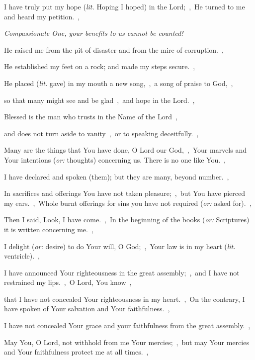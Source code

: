 \documentclass[12pt,twoside,a5paper]{article}
\newcommand{\qanona}[1]{{\liturgicalhint{Qanona.} \emph{#1}}}
\newcommand{\translationoption}[1]{\emph{or:} #1}
\newcommand{\translationliteral}[1]{\emph{lit.} #1}
\begin{document}
\begin{normalparskip}
  I have truly put my hope (\translationliteral{Hoping I hoped}) in the Lord;~\sep\ He turned to me and heard my petition.~\sep

  \qanona{Compassionate One, your benefits to us cannot be counted!}

  He raised me from the pit of disaster and from the mire of corruption.~\sep

  He established my feet on a rock; and made my steps secure.~\sep

  He placed (\translationliteral{gave}) in my mouth a new song,~\sep\ a song of praise to God,~\sep

  so that many might see and be glad~\sep\ and hope in the Lord.~\sep

  Blessed is the man who trusts in the Name of the Lord~\sep

  and does not turn aside to vanity~\sep\ or to speaking deceitfully.~\sep

  Many are the things that You have done, O Lord our God,~\sep\ Your marvels and Your intentions (\translationoption{thoughts}) concerning us. There is no one like You.~\sep

  I have declared and spoken (them); but they are many, beyond number.~\sep

  In sacrifices and offerings You have not taken pleasure;~\sep\ but You have pierced my ears.~\sep\ Whole burnt offerings for sins you have not required (\translationoption{asked for}).~\sep

  Then I said, Look, I have come.~\sep\ In the beginning of the books (\translationoption{Scriptures}) it is written concerning me.~\sep

  I delight (\translationoption{desire}) to do Your will, O God;~\sep\ Your law is in my heart (\translationliteral{ventricle}).~\sep

  I have announced Your righteousness in the great assembly;~\sep\ and I have not restrained my lips.~\sep\ O Lord, You know~\sep

  that I have not concealed Your righteousness in my heart.~\sep\ On the contrary, I have spoken of Your salvation and Your faithfulness.~\sep

  I have not concealed Your grace and your faithfulness from the great assembly.~\sep

  May You, O Lord, not withhold from me Your mercies;~\sep\ but may Your mercies and Your faithfulness protect me at all times.~\sep


\end{normalparskip}
\end{document}
